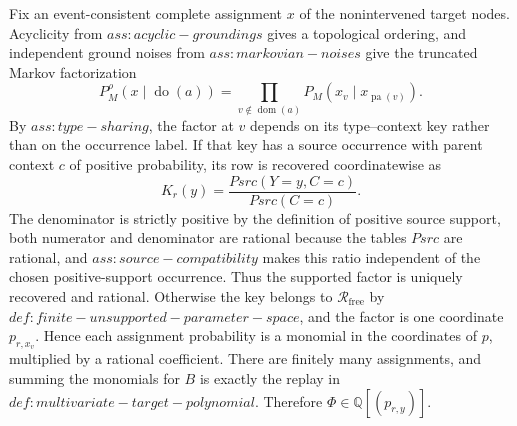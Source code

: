 Fix an event-consistent complete assignment \(x\) of the nonintervened target nodes.  Acyclicity from \(ass:acyclic-groundings\) gives a topological ordering, and independent ground noises from \(ass:markovian-noises\) give the truncated Markov factorization
\[
 P_M^\rho(x\mid\operatorname{do}(a))
 =\prod_{v\notin\operatorname{dom}(a)}
 P_M\!\left(x_v\mid x_{\operatorname{pa}(v)}\right).
\]
By \(ass:type-sharing\), the factor at \(v\) depends on its type--context key rather than on the occurrence label.  If that key has a source occurrence with parent context \(c\) of positive probability, its row is recovered coordinatewise as
\[
 K_r(y)=\frac{Psrc(Y=y,C=c)}{Psrc(C=c)}.
\]
The denominator is strictly positive by the definition of positive source support, both numerator and denominator are rational because the tables \(Psrc\) are rational, and \(ass:source-compatibility\) makes this ratio independent of the chosen positive-support occurrence.  Thus the supported factor is uniquely recovered and rational.  Otherwise the key belongs to \(\mathcal R_{\mathrm{free}}\) by \(def:finite-unsupported-parameter-space\), and the factor is one coordinate \(p_{r,x_v}\).  Hence each assignment probability is a monomial in the coordinates of \(p\), multiplied by a rational coefficient.  There are finitely many assignments, and summing the monomials for \(B\) is exactly the replay in \(def:multivariate-target-polynomial\).  Therefore \(\Phi\in\mathbb Q[(p_{r,y})]\).

